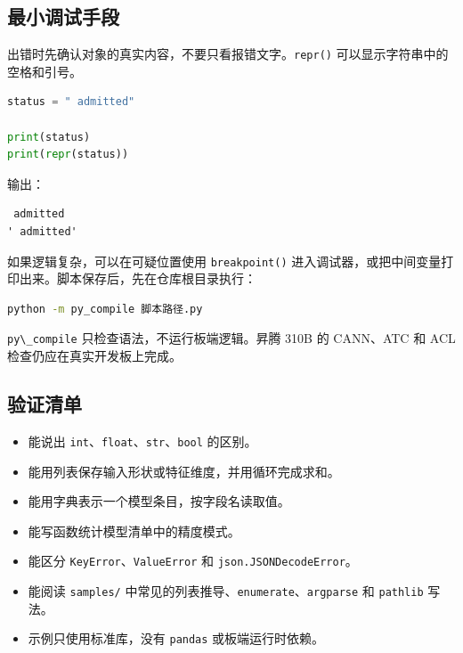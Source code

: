 \subsection{最小调试手段}\label{ux6700ux5c0fux8c03ux8bd5ux624bux6bb5}

出错时先确认对象的真实内容，不要只看报错文字。\passthrough{\lstinline!repr()!}
可以显示字符串中的空格和引号。

\begin{lstlisting}[language=Python]
status = " admitted"

print(status)
print(repr(status))
\end{lstlisting}

输出：

\begin{lstlisting}
 admitted
' admitted'
\end{lstlisting}

如果逻辑复杂，可以在可疑位置使用 \passthrough{\lstinline!breakpoint()!}
进入调试器，或把中间变量打印出来。脚本保存后，先在仓库根目录执行：

\begin{lstlisting}[language=bash]
python -m py_compile 脚本路径.py
\end{lstlisting}

\passthrough{\lstinline!py\_compile!} 只检查语法，不运行板端逻辑。昇腾
310B 的 CANN、ATC 和 ACL 检查仍应在真实开发板上完成。

\subsection{验证清单}\label{src-appendix-appendix3-validation}

\begin{itemize}
\tightlist
\item[$\square$]
  能说出
  \passthrough{\lstinline!int!}、\passthrough{\lstinline!float!}、\passthrough{\lstinline!str!}、\passthrough{\lstinline!bool!}
  的区别。
\item[$\square$]
  能用列表保存输入形状或特征维度，并用循环完成求和。
\item[$\square$]
  能用字典表示一个模型条目，按字段名读取值。
\item[$\square$]
  能写函数统计模型清单中的精度模式。
\item[$\square$]
  能区分
  \passthrough{\lstinline!KeyError!}、\passthrough{\lstinline!ValueError!}
  和 \passthrough{\lstinline!json.JSONDecodeError!}。
\item[$\square$]
  能阅读 \passthrough{\lstinline!samples/!}
  中常见的列表推导、\passthrough{\lstinline!enumerate!}、\passthrough{\lstinline!argparse!}
  和 \passthrough{\lstinline!pathlib!} 写法。
\item[$\square$]
  示例只使用标准库，没有 \passthrough{\lstinline!pandas!}
  或板端运行时依赖。
\end{itemize}

